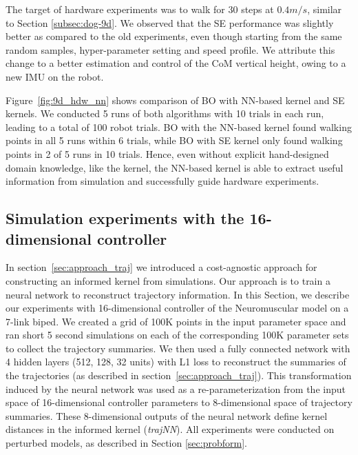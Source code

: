 The target of hardware experiments was to walk for 30 steps at $0.4m/s$, similar to Section \ref{subsec:dog-9d}. We observed that the SE performance was slightly better as compared to the old experiments, even though starting from the same random samples, hyper-parameter setting and speed profile. We attribute this change to a better estimation and control of the CoM vertical height, owing to a new IMU on the robot. 


Figure~\ref{fig:9d_hdw_nn} shows comparison of BO with NN-based kernel and SE kernels. We conducted 5 runs of both algorithms with 10 trials in each run, leading to a total of 100 robot trials. BO with the NN-based kernel found walking points in all 5 runs within 6 trials, while BO with SE kernel only found walking points in 2 of 5 runs in 10 trials.
Hence, even without explicit hand-designed domain knowledge, like the \dogkernel kernel, the NN-based kernel is able to extract useful information from simulation and successfully guide hardware experiments.


\subsection{Simulation experiments with the 16-dimensional controller}
\label{experiments_nm}

In section~\ref{sec:approach_traj} we introduced a cost-agnostic approach for constructing an informed kernel from simulations. Our approach is to train a neural network to reconstruct trajectory information. In this Section, we describe our experiments with 16-dimensional controller of the Neuromuscular model on a 7-link biped. We created a grid of 100K points in the input parameter space  and ran short 5 second simulations on each of the corresponding 100K parameter sets to collect the trajectory summaries. We then used a fully connected network with 4 hidden layers (512, 128, 32 units) with L1 loss to reconstruct the summaries of the trajectories (as described in section~\ref{sec:approach_traj}). This transformation induced by the neural network was used as a re-parameterization from the input space of 16-dimensional controller parameters to 8-dimensional space of trajectory summaries. These 8-dimensional outputs of the neural network define kernel distances in the informed kernel (\textit{trajNN}). All experiments were conducted on perturbed models, as described in Section \ref{sec:probform}.

